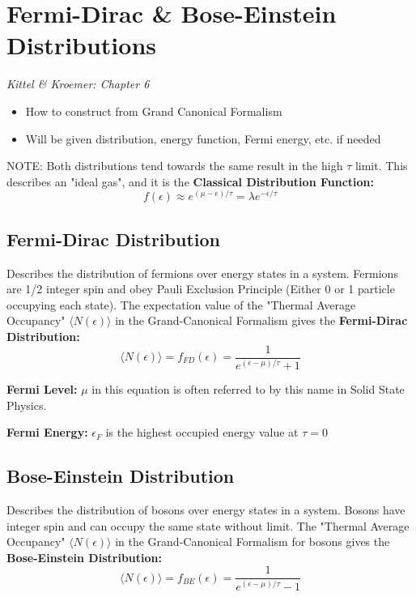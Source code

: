 \section{Fermi-Dirac \& Bose-Einstein Distributions}

\emph{Kittel \& Kroemer: Chapter 6}
\begin{itemize}
    \item How to construct from Grand Canonical Formalism
    \item Will be given distribution, energy function, Fermi energy, etc. if needed
\end{itemize}
NOTE: Both distributions tend towards the same result in the high $\tau$ limit. This describes an "ideal gas", and it is the \textbf{Classical Distribution Function:}
\[
f(\epsilon) \approx e^{(\mu-\epsilon)/\tau} = \lambda e^{-\epsilon/\tau}
\]
\subsection{Fermi-Dirac Distribution}

Describes the distribution of fermions over energy states in a system. Fermions are 1/2 integer spin and obey Pauli Exclusion Principle (Either 0 or 1 particle occupying each state). The expectation value of the "Thermal Average Occupancy" $\langle N(\epsilon) \rangle$ in the Grand-Canonical Formalism gives the \textbf{Fermi-Dirac Distribution:}
\[
\langle N(\epsilon) \rangle = f_{FD}(\epsilon) = \frac{1}{e^{(\epsilon - \mu)/\tau}+1}
\]

\textbf{Fermi Level:} $\mu$ in this equation is often referred to by this name in Solid State Physics.

\textbf{Fermi Energy:} $\epsilon_F$ is the highest occupied energy value at $\tau=0$




\subsection{Bose-Einstein Distribution}

Describes the distribution of bosons over energy states in a system. Bosons have integer spin and can occupy the same state without limit. The "Thermal Average Occupancy" $\langle N(\epsilon) \rangle$ in the Grand-Canonical Formalism for bosons gives the \textbf{Bose-Einstein Distribution:}
\[
\langle N(\epsilon) \rangle = f_{BE}(\epsilon) = \frac{1}{e^{(\epsilon - \mu)/\tau}-1}
\]
